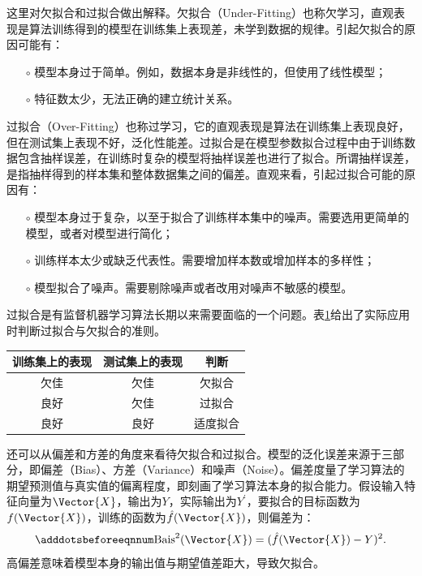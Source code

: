 这里对欠拟合和过拟合做出解释。欠拟合（Under-Fitting）也称欠学习，直观表现是算法训练得到的模型在训练集上表现差，未学到数据的规律。引起欠拟合的原因可能有：
\begin{enumerate}
  \item[$\circ$] 模型本身过于简单。例如，数据本身是非线性的，但使用了线性模型；
  \item[$\circ$] 特征数太少，无法正确的建立统计关系。
\end{enumerate}

过拟合（Over-Fitting）也称过学习，它的直观表现是算法在训练集上表现良好，但在测试集上表现不好，泛化性能差。过拟合是在模型参数拟合过程中由于训练数据包含抽样误差，在训练时复杂的模型将抽样误差也进行了拟合。所谓抽样误差，是指抽样得到的样本集和整体数据集之间的偏差。直观来看，引起过拟合可能的原因有：
\begin{enumerate}
  \item[$\circ$] 模型本身过于复杂，以至于拟合了训练样本集中的噪声。需要选用更简单的模型，或者对模型进行简化；
  \item[$\circ$] 训练样本太少或缺乏代表性。需要增加样本数或增加样本的多样性；
  \item[$\circ$] 模型拟合了噪声。需要剔除噪声或者改用对噪声不敏感的模型。
\end{enumerate}

过拟合是有监督机器学习算法长期以来需要面临的一个问题。表\ref{tab:ml_overfit}给出了实际应用时判断过拟合与欠拟合的准则。
\begin{table}[!htbp]
  \label{tab:ml_overfit}
  \centering
  \footnotesize
  \begin{tabular}{ccc}
    \toprule
    训练集上的表现 & 测试集上的表现 & 判断 \\
    \midrule
    欠佳 & 欠佳 & 欠拟合 \\
    良好 & 欠佳 & 过拟合 \\
    良好 & 良好 & 适度拟合 \\
    \bottomrule
  \end{tabular}
\end{table}

还可以从偏差和方差的角度来看待欠拟合和过拟合。模型的泛化误差来源于三部分，即偏差（Bias）、方差（Variance）和噪声（Noise）。偏差度量了学习算法的期望预测值与真实值的偏离程度，即刻画了学习算法本身的拟合能力。假设输入特征向量为$\Vector{X}$，输出为$Y$，实际输出为$Y^{\prime}$，要拟合的目标函数为$f(\Vector{X})$，训练的函数为$\hat{f}(\Vector{X})$，则偏差为：
\begin{equation}\adddotsbeforeeqnnum
  \label{eq:ml_bias}
  \text{Bais}^2(\Vector{X})=(\hat{f}(\Vector{X})-Y)^2.
\end{equation}
高偏差意味着模型本身的输出值与期望值差距大，导致欠拟合。

